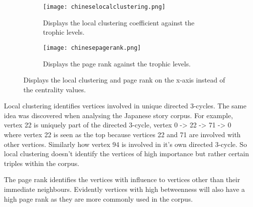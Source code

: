 \begin{figure}[H]
\centering
\begin{subfigure}{.45\textwidth}
	\hspace{-1cm} 
	\texttt{[image: chineselocalclustering.png]}
	\caption{Displays the local clustering coefficient against the trophic levels.}
	\label{fig:cnlc}
\end{subfigure}
\hfill
\begin{subfigure}{.45\textwidth}
	\hspace{-1cm} 
	\texttt{[image: chinesepagerank.png]}
	\caption{Displays the page rank against the trophic levels.}
	\label{fig:cnpr}
\end{subfigure}
\caption{Displays the local clustering and page rank on the x-axis instead of the centrality values.}
\label{fig:jpother}
\end{figure}

Local clustering identifies vertices involved in unique directed 3-cycles. The same idea was discovered when analysing the Japanese story corpus. For example, vertex 22 is uniquely part of the directed 3-cycle, vertex 0 -> 22 -> 71 -> 0 where vertex 22 is seen as the top because vertices 22 and 71 are involved with other vertices. Similarly how vertex 94 is involved in it's own directed 3-cycle. So local clustering doesn't identify the vertices of high importance but rather certain triples within the corpus. 

The page rank identifies the vertices with influence to vertices other than their immediate neighbours.  Evidently vertices with high betweenness will also have a high page rank as they are more commonly used in the corpus. 

